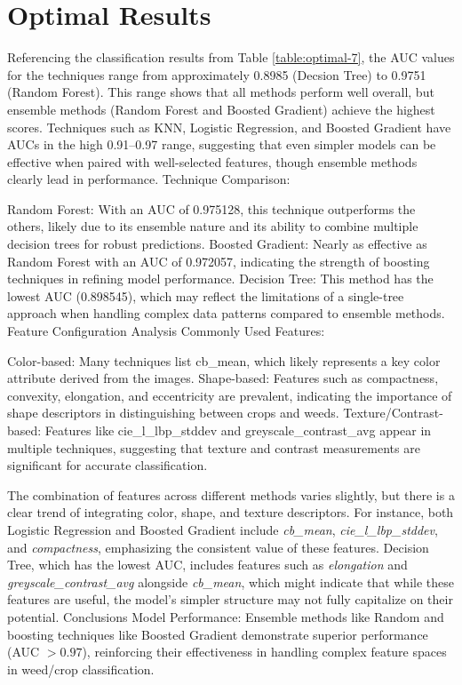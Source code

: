 \documentclass[letterpaper]{report}
\begin{document}
\section{Optimal Results}
Referencing the classification results from Table \ref{table:optimal-7}, the AUC values for the techniques range from approximately 0.8985 (Decsion Tree) to 0.9751 (Random Forest). This range shows that all methods perform well overall, but ensemble methods (Random Forest and Boosted Gradient) achieve the highest scores.
Techniques such as KNN, Logistic Regression, and Boosted Gradient have AUCs in the high 0.91–0.97 range, suggesting that even simpler models can be effective when paired with well-selected features, though ensemble methods clearly lead in performance.
Technique Comparison:

Random Forest: With an AUC of 0.975128, this technique outperforms the others, likely due to its ensemble nature and its ability to combine multiple decision trees for robust predictions.
Boosted Gradient: Nearly as effective as Random Forest with an AUC of 0.972057, indicating the strength of boosting techniques in refining model performance.
Decision Tree: This method has the lowest AUC (0.898545), which may reflect the limitations of a single-tree approach when handling complex data patterns compared to ensemble methods.
Feature Configuration Analysis
Commonly Used Features:

Color-based: Many techniques list cb\_mean, which likely represents a key color attribute derived from the images.
Shape-based: Features such as compactness, convexity, elongation, and eccentricity are prevalent, indicating the importance of shape descriptors in distinguishing between crops and weeds.
Texture/Contrast-based: Features like cie\_l\_lbp\_stddev and greyscale\_contrast\_avg appear in multiple techniques, suggesting that texture and contrast measurements are significant for accurate classification.

The combination of features across different methods varies slightly, but there is a clear trend of integrating color, shape, and texture descriptors. For instance, both Logistic Regression and Boosted Gradient include \textit{cb\_mean}, \textit{cie\_l\_lbp\_stddev}, and \textit{compactness}, emphasizing the consistent value of these features.
Decision Tree, which has the lowest AUC, includes features such as \textit{elongation} and \textit{greyscale\_contrast\_avg} alongside \textit{cb\_mean}, which might indicate that while these features are useful, the model’s simpler structure may not fully capitalize on their potential.
Conclusions
Model Performance:
Ensemble methods like Random  and boosting techniques like Boosted Gradient demonstrate superior performance (AUC $> 0.97$), reinforcing their effectiveness in handling complex feature spaces in weed/crop classification.
\end{document}
